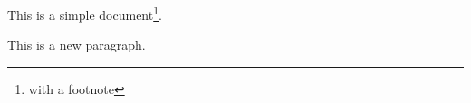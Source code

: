 \documentclass[a4paper,12pt]{article}
\begin{document}
This is a simple document\footnote{with a footnote}.

This is a new paragraph.
\end{document}
